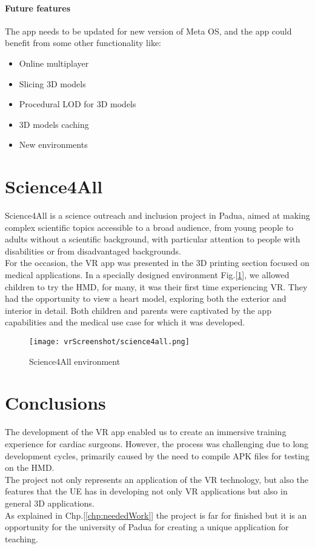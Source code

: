 \paragraph{Future features}
The app needs to be updated for new version of Meta OS, and the app could benefit from some other functionality like:

\begin{itemize}
  \item Online multiplayer
  \item	Slicing 3D models
  \item Procedural \ac{LOD} for 3D models
  \item	3D models caching 
  \item	New environments
\end{itemize}

\section{Science4All}
\noindent
Science4All is a science outreach and inclusion project in Padua, aimed at making complex scientific topics accessible to a broad audience,
from young people to adults without a scientific background, with particular attention to people with disabilities or from disadvantaged backgrounds.\\
For the occasion, the \ac{VR} app was presented in the 3D printing section focused on medical applications. In a specially designed environment Fig.[\ref{fig:science4all}], we allowed children to try the \ac{HMD}, for many, it was their first time experiencing \ac{VR}. They had the opportunity to view a heart model, exploring both the exterior and interior in detail.
Both children and parents were captivated by the app capabilities and the medical use case for which it was developed.

\begin{figure}[ht]
  \centering
  \texttt{[image: vrScreenshot/science4all.png]}
  \caption{Science4All environment}
  \label{fig:science4all}
\end{figure}

\section{Conclusions}
\noindent
The development of the \ac{VR} app enabled us to create an immersive training experience for cardiac surgeons.
However, the process was challenging due to long development cycles, primarily caused by the need to compile \ac{APK} files for testing on the \ac{HMD}.\\
The project not only represents an application of the \ac{VR} technology, but also the features  that the \ac{UE} has in developing not only \ac{VR} applications but also in general 3D applications.\\
As explained in Chp.[\ref{chp:neededWork}] the project is far for finished but it is an opportunity for the university of Padua  for creating a unique application for teaching.\\